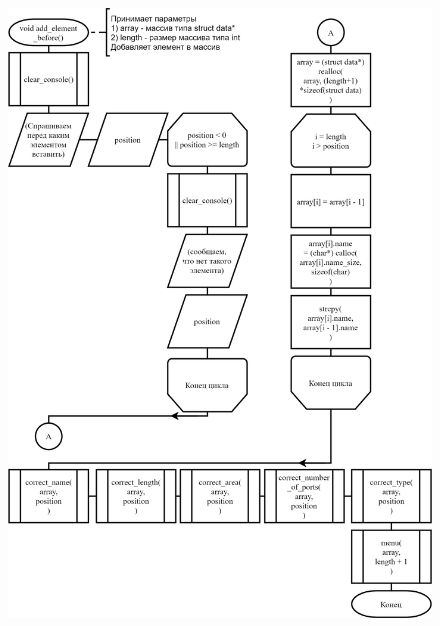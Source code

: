 \begin{figure}[!htp]
    \includegraphics{../../Makefile-project/src/submenu/add_element_before/add_element_before.png}
\end{figure}
